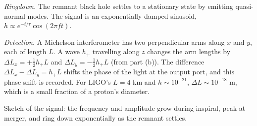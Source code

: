 \documentclass[12pt]{article}
\begin{document}
\emph{Ringdown.} The remnant black hole settles to a stationary state by emitting quasi-normal modes. The signal is an exponentially damped sinusoid, $h\propto e^{-t/\tau}\cos(2\pi f t)$.

\emph{Detection.} A Michelson interferometer has two perpendicular arms along $x$ and $y$, each of length $L$. A wave $h_+$ travelling along $z$ changes the arm lengths by $\Delta L_x=+\tfrac12h_+L$ and $\Delta L_y=-\tfrac12h_+L$ (from part (b)). The difference $\Delta L_x-\Delta L_y=h_+L$ shifts the phase of the light at the output port, and this phase shift is recorded. For LIGO's $L=4$ km and $h\sim10^{-21}$, $\Delta L\sim10^{-18}$ m, which is a small fraction of a proton's diameter.

\begin{center}
\end{center}

\noindent Sketch of the signal: the frequency and amplitude grow during inspiral, peak at merger, and ring down exponentially as the remnant settles.
\end{document}
